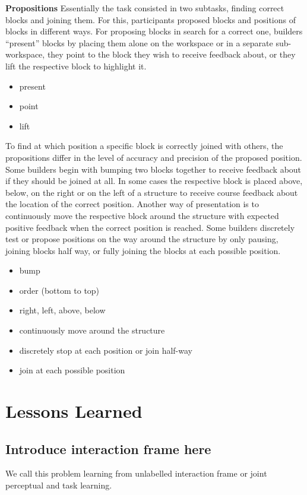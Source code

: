 \textbf{Propositions} Essentially the task consisted in two subtasks, finding correct blocks and joining them. For this, participants proposed blocks and positions of blocks in different ways. For proposing blocks in search for a correct one, builders ``present'' blocks by placing them alone on the workspace or in a separate sub-workspace, they point to the block they wish to receive feedback about, or they lift the respective block to highlight it.
\begin{itemize}
\item present
\item point
\item lift
\end{itemize}
To find at which position a specific block is correctly joined with others, the propositions differ in the level of accuracy and precision of the proposed position. Some builders begin with bumping two blocks together to receive feedback about if they should be joined at all. In some cases the respective block is placed above, below, on the right or on the left of a structure to receive course feedback about the location of the correct position. Another way of presentation is to continuously move the respective block around the structure with expected positive feedback when the correct position is reached. Some builders discretely test or propose positions on the way around the structure by only pausing, joining blocks half way, or fully joining the blocks at each possible position.
\begin{itemize}
\item bump
\item order (bottom to top)
\item right, left, above, below
\item continuously move around the structure
\item discretely stop at each position or join half-way
\item join at each possible position
\end{itemize}

\section{Lessons Learned}

\subsection{Introduce interaction frame here}
We call this problem learning from unlabelled interaction frame or joint perceptual and task learning.

